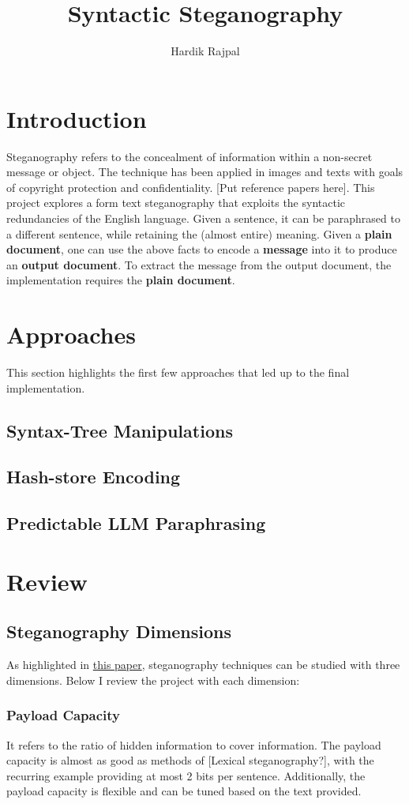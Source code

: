 \documentclass{article}
\author{Hardik Rajpal}
\title{Syntactic Steganography}
\begin{document}
\maketitle
\section{Introduction}
Steganography refers to the concealment of information within a non-secret message or object. The technique has been applied in images and texts with goals of copyright protection and confidentiality. [Put reference papers here]. This project explores a form text steganography that exploits the syntactic redundancies of the English language. Given a sentence, it can be
paraphrased to a different sentence, while retaining the (almost entire) meaning. Given a \textbf{plain document}, one can use the above facts to encode a \textbf{message} into it to produce an \textbf{output document}. To extract the message from the output document, the implementation requires the \textbf{plain document}.
\section{Approaches}
This section highlights the first few approaches that led up to the final implementation.
\subsection{Syntax-Tree Manipulations}
\subsection{Hash-store Encoding}
\subsection{Predictable LLM Paraphrasing}
\section{Review}
\subsection{Steganography Dimensions}
As highlighted in
\href{https://www.researchgate.net/publication/267767675_Syntactic_Bank-based_Linguistic_Steganography_Approach}{this paper},
steganography techniques can be studied with three dimensions. Below I review the project with each dimension:
\subsubsection{Payload Capacity}
It refers to the ratio of hidden information to cover information. The payload capacity is almost as good as methods of [Lexical steganography?], with the recurring example providing
at most 2 bits per sentence. Additionally, the payload capacity is flexible and can be tuned
based on the text provided.
\end{document}
